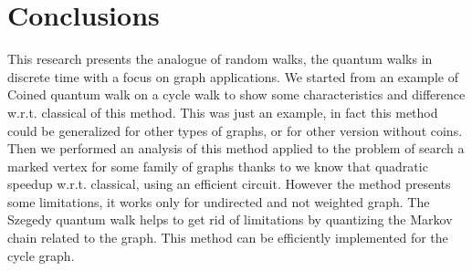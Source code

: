 \section{Conclusions}

This research presents the analogue of random walks, the quantum walks in discrete time with a focus on graph applications. We started from 
an example of Coined quantum walk on a cycle walk to show some characteristics and difference w.r.t. classical of this method. This was just
an example, in fact this method could be generalized for other types of graphs, or for other version without coins. Then we performed
an analysis of this method applied to the problem of search a marked vertex for some family of graphs thanks to \cite{douglas2014complexity}
we know that quadratic speedup w.r.t. classical, using an efficient circuit. However the method presents some limitations, it works only for undirected and not weighted graph. The Szegedy
quantum walk helps to get rid of limitations by quantizing the Markov chain related to the graph. This method
can be efficiently implemented for the cycle graph.    